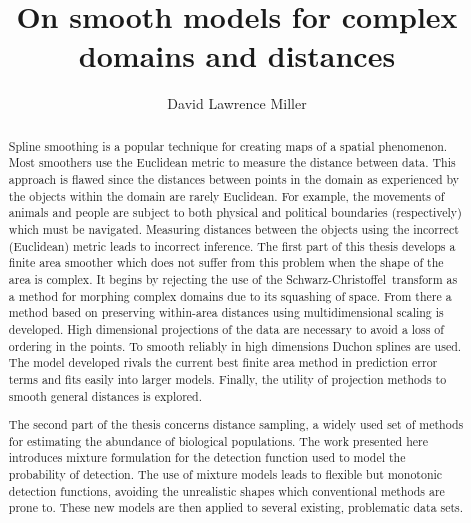 \documentclass[12pt]{report}
\title{On smooth models for complex domains and distances}
\author{David Lawrence Miller}
\newcommand{\sch}{Schwarz-Christoffel}
\begin{document}
\maketitle

%



\begin{abstract} 
Spline smoothing is a popular technique for creating maps of a spatial phenomenon. Most smoothers use the Euclidean metric to measure the distance between data. This approach is flawed since the distances between points in the domain as experienced by the objects within the domain are rarely Euclidean. For example, the movements of animals and people are subject to both physical and political boundaries (respectively) which must be navigated. Measuring distances between the objects using the incorrect (Euclidean) metric leads to incorrect inference\label{cor-r14-2}. The first part of this thesis develops a finite area smoother which does not suffer from this problem when the shape of the area is complex. It begins by rejecting the use of the \sch\ transform as a method for morphing complex domains due to its squashing of space. From there a method based on preserving within-area distances using multidimensional scaling is developed. High dimensional projections of the data are necessary to avoid a loss of ordering in the points. To smooth reliably in high dimensions Duchon splines are used. The model developed rivals the current best finite area method in prediction error terms and fits easily into larger models. Finally, the utility of projection methods to smooth general distances is explored.

The second part of the thesis concerns distance sampling, a widely used set of methods for estimating the abundance of biological populations. The work presented here introduces mixture formulation for the detection function used to model the probability of detection. The use of mixture models leads to flexible but monotonic detection functions, avoiding the unrealistic shapes which conventional methods are prone to. These new models are then applied to several existing, problematic data sets.

\newpage


\end{abstract}
\end{document}
